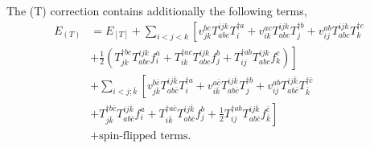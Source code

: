 \documentclass[a4paper,12pt,oneside]{book}
\newcommand{\half}{\frac{1}{2}}
\newcommand{\spa}[1]{{#1}}
\newcommand{\spb}[1]{\bar{#1}}
\begin{document}
The (T) correction contains additionally the following terms,
\begin{equation}
\begin{aligned}
\label{eq:Euccsd(t)}
E_{(T)}&=E_{[T]} 
+ \sum_{\spa{i}\lt\spa{j}\lt\spa{k}}\left[ 
v_{\spa{j}\spa{k}}^{\spa{b}\spa{c}} T_{\spa{a}\spa{b}\spa{c}}^{\spa{i}\spa{j}\spa{k}} T_{\spa{i}}^{\dagger \spa{a}} 
+v_{\spa{i}\spa{k}}^{\spa{a}\spa{c}} T_{\spa{a}\spa{b}\spa{c}}^{\spa{i}\spa{j}\spa{k}} T_{\spa{j}}^{\dagger \spa{b}} 
+v_{\spa{i}\spa{j}}^{\spa{a}\spa{b}} T_{\spa{a}\spa{b}\spa{c}}^{\spa{i}\spa{j}\spa{k}} T_{\spa{k}}^{\dagger \spa{c}} 
\right.\\
&\left.
 + \half\left( T_{\spa{j}\spa{k}}^{\dagger \spa{b}\spa{c}} T_{\spa{a}\spa{b}\spa{c}}^{\spa{i}\spa{j}\spa{k}} f_{\spa{i}}^{\spa{a}}
 + T_{\spa{i}\spa{k}}^{\dagger \spa{a}\spa{c}} T_{\spa{a}\spa{b}\spa{c}}^{\spa{i}\spa{j}\spa{k}} f_{\spa{j}}^{\spa{b}}
 + T_{\spa{i}\spa{j}}^{\dagger \spa{a}\spa{b}} T_{\spa{a}\spa{b}\spa{c}}^{\spa{i}\spa{j}\spa{k}} f_{\spa{k}}^{\spa{c}}
 \right)\right]\\
&+ \sum_{\spa{i}\lt\spa{j}; \spb{k}} \left[
v_{\spa{j}\spb{k}}^{\spa{b}\spb{c}} T_{\spa{a}\spa{b}\spb{c}}^{\spa{i}\spa{j}\spb{k}} T_{\spa{i}}^{\dagger \spa{a}} 
+v_{\spa{i}\spb{k}}^{\spa{a}\spb{c}} T_{\spa{a}\spa{b}\spb{c}}^{\spa{i}\spa{j}\spb{k}} T_{\spa{j}}^{\dagger \spa{b}} 
 + v_{\spa{i}\spa{j}}^{\spa{a}\spa{b}} T_{\spa{a}\spa{b}\spb{c}}^{\spa{i}\spa{j}\spb{k}} T_{\spb{k}}^{\dagger \spb{c}} 
\right.\\
&\left.
 + T_{\spa{j}\spb{k}}^{\dagger \spa{b}\spb{c}} T_{\spa{a}\spa{b}\spb{c}}^{\spa{i}\spa{j}\spb{k}} f_{\spa{i}}^{\spa{a}} 
 + T_{\spa{i}\spb{k}}^{\dagger \spa{a}\spb{c}} T_{\spa{a}\spa{b}\spb{c}}^{\spa{i}\spa{j}\spb{k}} f_{\spa{j}}^{\spa{b}} 
 + \half T_{\spa{i}\spa{j}}^{\dagger \spa{a}\spa{b}} T_{\spa{a}\spa{b}\spb{c}}^{\spa{i}\spa{j}\spb{k}} f_{\spb{k}}^{\spb{c}} 
 \right] \\
 &+ \mbox{spin-flipped terms}.
\end{aligned}
\end{equation}
\end{document}
